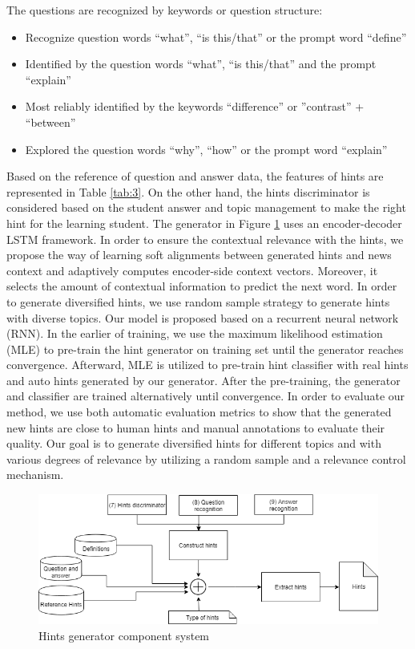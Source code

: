 \documentclass[letterpaper%
, twoside%
, 12pt%
,these%
, english%
,creativecommons,hyperref, withAlgo2e %
]{thETS}
\begin{document}
The questions are recognized by keywords or  question structure:
\begin{itemize}
	\item  Recognize question words “what”, “is this/that” or the prompt word “define”
	\item Identified by the question words “what”, “is this/that” and the prompt “explain”
	\item Most reliably identified by the keywords “difference” or ”contrast” + “between”
	\item Explored the question words “why”, “how” or the prompt word “explain”    
\end{itemize}
Based on the reference of question and answer data, the features of hints are represented in Table \ref{tab:3}. On the other hand, the hints discriminator is considered based on the student answer and topic management to make the right hint for the learning student. The generator in Figure \ref{hints} uses an encoder-decoder LSTM framework. In order to ensure the contextual relevance with the hints, we propose the way of learning soft alignments between generated hints and news context and adaptively computes encoder-side context vectors. Moreover, it selects the amount of contextual information to predict the next word. In order to generate diversified hints, we use random sample strategy to generate hints with diverse topics. Our model is proposed based on a recurrent neural network (RNN). In the earlier of training, we use the maximum likelihood estimation (MLE) to pre-train the hint generator on training set until the generator reaches convergence. Afterward, MLE is utilized to pre-train hint classifier with real hints and auto hints generated by our generator. After the pre-training, the generator and classifier are trained alternatively until convergence. In order to evaluate our method, we use both automatic evaluation metrics to show that the generated new hints are close to human hints and manual annotations to evaluate their quality.  Our goal is to generate diversified hints for different topics and with various degrees of relevance by utilizing a random sample and a relevance control mechanism. 

\begin{figure}
	\includegraphics[width=.9\textwidth]{Figures/ht2.png}
	\caption{Hints generator component system}
	\label{hints}
\end{figure} 
\end{document}
